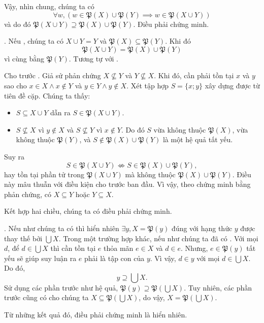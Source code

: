 Vậy, nhìn chung, chúng ta có
$$\forall w, \left( w \in \mathfrak{P}(X) \cup \mathfrak{P}(Y) \implies w \in \mathfrak{P}(X \cup Y) \right)$$
và do đó $\mathfrak{P}(X \cup Y) \supseteq \mathfrak{P}(X) \cup \mathfrak{P}(Y)$. Điều phải chứng minh.

. Nếu , chúng ta có $X \cup Y = Y$ và $\mathfrak{P}(X) \subseteq \mathfrak{P}(Y)$. Khi đó $$\mathfrak{P}(X \cup Y) = \mathfrak{P}(X) \cup \mathfrak{P}(Y)$$ vì cùng bằng $\mathfrak{P}(Y)$. Tương tự với .

Cho trước . Giả sử phản chứng $X \not\subseteq Y$ và $Y \not\subseteq X$. Khi đó, cần phải tồn tại $x$ và $y$ sao cho $x \in X \land x \notin Y$ và $y \in Y \land y \notin X$.
Xét tập hợp $S = \{x; y\}$ xây dựng được từ tiên đề cặp. Chúng ta thấy:
\begin{itemize}
   \item $S \subseteq X \cup Y$ dẫn ra $S \in \mathfrak{P}(X \cup Y)$.
   \item $S \not\subseteq X$ vì $y \notin X$ và $S \not\subseteq Y$ vì $x \notin Y$. Do đó $S$ vừa không thuộc $\mathfrak{P}(X)$, vừa không thuộc $\mathfrak{P}(Y)$, và $S \notin \mathfrak{P}(X) \cup \mathfrak{P}(Y)$ là một hệ quả tất yếu.
\end{itemize}
Suy ra $$S \in \mathfrak{P}(X \cup Y) \nLeftrightarrow S \in \mathfrak{P}(X) \cup \mathfrak{P}(Y),$$ hay tồn tại phần tử trong $\mathfrak{P}(X \cup Y)$ mà không thuộc $\mathfrak{P}(X) \cup \mathfrak{P}(Y)$. Điều này mâu thuẫn với điều kiện cho trước ban đầu. Vì vậy, theo chứng minh bằng phản chứng, có $X \subseteq Y$ hoặc $Y \subseteq X$.

Kết hợp hai chiều, chúng ta có điều phải chứng minh.

. Nếu như chúng ta có  thì hiển nhiên $\exists y, X = \mathfrak{P}(y)$ đúng với hạng thức $y$ được thay thế bởi $\bigcup X$. Trong một trường hợp khác, nếu như chúng ta đã có . Với mọi $d$, để $d \in \bigcup X$ thì cần tồn tại $e$ thỏa mãn $e \in X$ và $d \in e$. Nhưng, $e \in \mathfrak{P}(y)$ tất yếu sẽ giúp suy luận ra $e$ phải là tập con của $y$. Vì vậy, $d \in y$ với mọi $d \in \bigcup X$. Do đó, $$y \supseteq \bigcup X.$$ Sử dụng các phần trước như hệ quả, $\mathfrak{P}(y) \supseteq \mathfrak{P}\left(\bigcup X\right)$. Tuy nhiên, các phần trước cũng có cho chúng ta $X \subseteq \mathfrak{P}\left(\bigcup X\right)$, do vậy, $X = \mathfrak{P}\left(\bigcup X\right)$.

Từ những kết quả đó, điều phải chứng minh là hiển nhiên.

